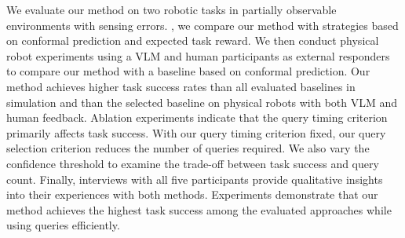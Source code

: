 


We evaluate our method on two robotic tasks in partially observable environments with sensing errors. , we compare our method with strategies based on conformal prediction and expected task reward. We then conduct physical robot experiments using a VLM and human participants as external responders to compare our method with a baseline based on conformal prediction. Our method achieves higher task success rates than all evaluated baselines in simulation and than the selected baseline on physical robots with both VLM and human feedback. Ablation experiments indicate that the query timing criterion primarily affects task success. With our query timing criterion fixed, our query selection criterion reduces the number of queries required. We also vary the confidence threshold to examine the trade-off between task success and query count. Finally, interviews with all five participants provide qualitative insights into their experiences with both methods. Experiments demonstrate that our method achieves the highest task success among the evaluated approaches while using queries efficiently.



